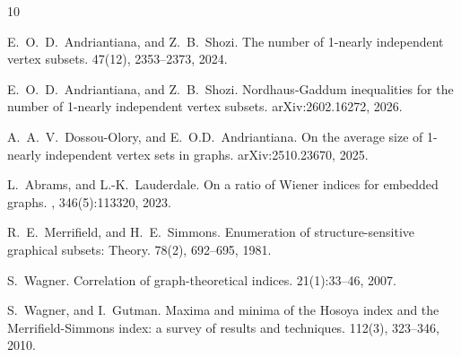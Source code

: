 \documentclass[a4paper,12pt]{amsart}
\begin{document}
\begin{thebibliography}{10}

E.~O.~D.~Andriantiana, and Z.~B.~Shozi.
\newblock The number of 1-nearly independent vertex subsets.
 47(12), 2353--2373, 2024.

E.~O.~D.~Andriantiana, and Z.~B.~Shozi.
\newblock Nordhaus-Gaddum inequalities for the number of 1-nearly independent vertex subsets.
 arXiv:2602.16272, 2026.

A.~A.~V.~Dossou-Olory, and E.~O.D.~Andriantiana.
\newblock On the average size of 1-nearly independent vertex sets in graphs.
 arXiv:2510.23670, 2025.

L.~Abrams, and L.-K.~Lauderdale.
\newblock On a ratio of Wiener indices for embedded graphs. 
, 346(5):113320, 2023.

R.~E.~Merrifield, and H.~E.~Simmons.
\newblock Enumeration of structure-sensitive graphical subsets: Theory.
 78(2), 692--695, 1981.

S.~Wagner.
\newblock Correlation of graph-theoretical indices.
 21(1):33--46, 2007.

S.~Wagner, and I.~Gutman.
\newblock Maxima and minima of the Hosoya index and the Merrifield-Simmons index: a survey of results and techniques.
 112(3), 323--346, 2010.

\end{thebibliography}


%
\end{document}
